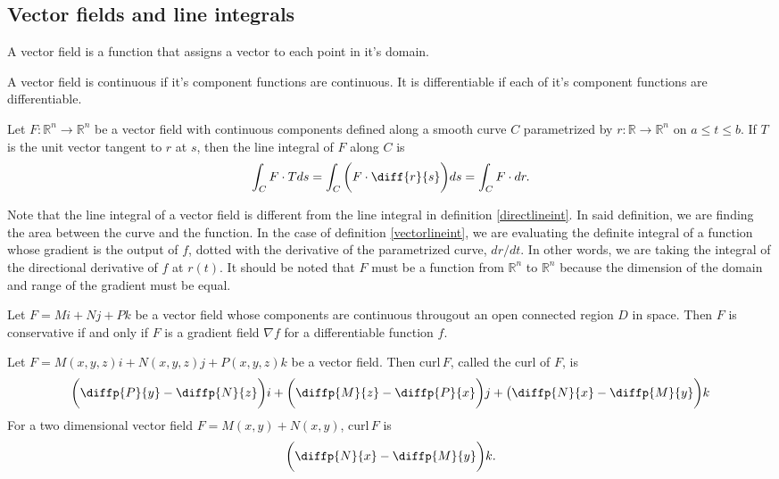 \documentclass{article}
\begin{document}
\subsection{Vector fields and line integrals}
\begin{definition}
	A vector field is a function that assigns a vector to each point in it's domain.
\end{definition}
\begin{proposition}
	A vector field is continuous if it's component functions are continuous. It is differentiable if each of it's component functions are differentiable.
\end{proposition}
\begin{definition}
	\label{vectorlineint}
	Let \(F:\mathbb{R}^n\rightarrow\mathbb{R}^n\) be a vector field with continuous components defined along a smooth curve \(C\) parametrized by \(r:\mathbb{R}\rightarrow\mathbb{R}^n\) on \(a\leq t\leq b\). If \(T\) is the unit vector tangent to \(r\) at \(s\), then the line integral of \(F\) along \(C\) is
	\begin{equation*}
		\int_C F\cdot Tds=\int_C\bigg(F\cdot\diff{r}{s}\bigg)ds=\int_CF\cdot dr.
	\end{equation*}
\end{definition}
\begin{remark}
	Note that the line integral of a vector field is different from the line integral in definition \ref{directlineint}. In said definition, we are finding the area between the curve and the function. In the case of definition \ref{vectorlineint}, we are evaluating the definite integral of a function whose gradient is the output of \(f\), dotted with the derivative of the parametrized curve, \(dr/dt\). In other words, we are taking the integral of the directional derivative of \(f\) at \(r(t)\). It should be noted that \(F\) must be a function from \(\mathbb{R}^n\) to \(\mathbb{R}^n\) because the dimension of the domain and range of the gradient must be equal.
\end{remark}
\begin{theorem}
	Let \(F=Mi+Nj+Pk\) be a vector field whose components are continuous througout an open connected region \(D\) in space. Then \(F\) is conservative if and only if \(F\) is a gradient field \(\nabla f\) for a differentiable function \(f\).
\end{theorem}
\begin{definition}[Curl]
	Let \(F=M(x,y,z)i+N(x,y,z)j+P(x,y,z)k\) be a vector field. Then \(\text{curl}\,F\), called the curl of \(F\), is
	\begin{equation*}
		\bigg(\diffp{P}{y}-\diffp{N}{z}\bigg)i+\bigg(\diffp{M}{z}-\diffp{P}{x}\bigg)j+\big(\diffp{N}{x}-\diffp{M}{y}\bigg)k
	\end{equation*}
	For a two dimensional vector field \(F=M(x,y)+N(x,y)\), \(\text{curl}\,F\) is
	\begin{equation*}
		\bigg(\diffp{N}{x}-\diffp{M}{y}\bigg)k.
	\end{equation*}
\end{definition}
\end{document}
